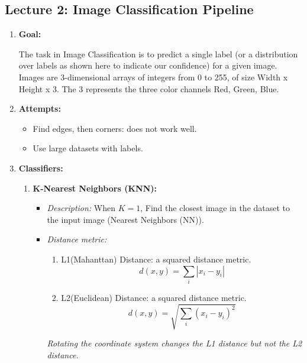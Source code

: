\documentclass{article}
\numberwithin{equation}{section}
\begin{document}
\begin{CJK}{UTF8}{gbsn}
\section*{Lecture 2: Image Classification Pipeline}
\setcounter{section}{2}
\setcounter{equation}{0}
\begin{enumerate}
    \item \textbf{Goal:}\par
    The task in Image Classification is to predict a single label (or a distribution over labels as shown here to indicate our confidence) for a given image. Images are 3-dimensional arrays of integers from 0 to 255, of size Width x Height x 3. The 3 represents the three color channels Red, Green, Blue.\par
    \item \textbf{Attempts:}
    \begin{itemize}
        \item Find edges, then corners: does not work well.
        \item Use large datasets with labels.
    \end{itemize}
    \item \textbf{Classifiers:}
    \begin{enumerate}
        \item \textbf{K-Nearest Neighbors (KNN):}
        \begin{itemize}
            \item \textit{Description:} When \(K = 1\), Find the closest image in the dataset to the input image (Nearest Neighbors (NN)).
            \item \textit{Distance metric:}
            \begin{enumerate} 
                \item L1(Mahanttan) Distance: a squared distance metric.
                \begin{equation}
                    d(x,y) = \sum_i |x_i - y_i|
                \end{equation}
        
                \item L2(Euclidean) Distance: a squared distance metric.
                \begin{equation}
                    d(x,y) = \sqrt{\sum_i (x_i - y_i)^2}
                \end{equation}
            \end{enumerate}
            \textit{Rotating the coordinate system changes the L1 distance but not the L2 distance.}
            

\end{itemize}
\end{enumerate}
\end{enumerate}
\end{CJK}
\end{document}
